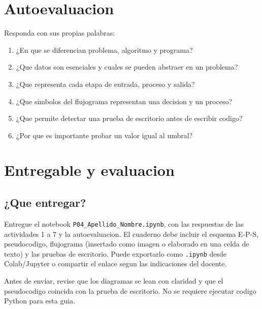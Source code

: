 \documentclass[11pt,a4paper]{article}
\newcommand{\code}[1]{\texttt{#1}}
\begin{document}
\section{Autoevaluacion}
Responda con sus propias palabras:
\begin{enumerate}
  \item ¿En que se diferencian problema, algoritmo y programa?
  \item ¿Que datos son esenciales y cuales se pueden abstraer en un problema?
  \item ¿Que representa cada etapa de entrada, proceso y salida?
  \item ¿Que simbolos del flujograma representan una decision y un proceso?
  \item ¿Que permite detectar una prueba de escritorio antes de escribir codigo?
  \item ¿Por que es importante probar un valor igual al umbral?
\end{enumerate}

\section{Entregable y evaluacion}
\subsection{¿Que entregar?}
Entregue el notebook \code{P04\_Apellido\_Nombre.ipynb}, con las respuestas de las actividades 1 a 7 y la autoevaluacion. El cuaderno debe incluir el esquema E-P-S, pseudocodigo, flujograma (insertado como imagen o elaborado en una celda de texto) y las pruebas de escritorio. Puede exportarlo como \code{.ipynb} desde Colab/Jupyter o compartir el enlace segun las indicaciones del docente.

Antes de enviar, revise que los diagramas se lean con claridad y que el pseudocodigo coincida con la prueba de escritorio. No se requiere ejecutar codigo Python para esta guia.
\end{document}
